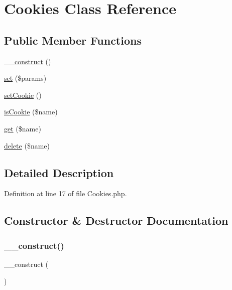 \hypertarget{class_zest_1_1_cookies_1_1_cookies}{}\section{Cookies Class Reference}
\label{class_zest_1_1_cookies_1_1_cookies}
\subsection*{Public Member Functions}
\begin{DoxyCompactItemize}
\item 
\mbox{\hyperlink{class_zest_1_1_cookies_1_1_cookies_a095c5d389db211932136b53f25f39685}{\+\_\+\+\_\+construct}} ()
\item 
\mbox{\hyperlink{class_zest_1_1_cookies_1_1_cookies_a8b2f390bd6d86a3f047038e3535028b8}{set}} (\$params)
\item 
\mbox{\hyperlink{class_zest_1_1_cookies_1_1_cookies_a46c656a0b18e88410d3067af69868a63}{set\+Cookie}} ()
\item 
\mbox{\hyperlink{class_zest_1_1_cookies_1_1_cookies_ac6f668aff0e191a6077c7b2c1694d4cd}{is\+Cookie}} (\$name)
\item 
\mbox{\hyperlink{class_zest_1_1_cookies_1_1_cookies_af5ea6a083ddb07beb8a30dd32e309ceb}{get}} (\$name)
\item 
\mbox{\hyperlink{class_zest_1_1_cookies_1_1_cookies_af7c3ea3150164bc92700134803f277be}{delete}} (\$name)
\end{DoxyCompactItemize}


\subsection{Detailed Description}


Definition at line 17 of file Cookies.\+php.



\subsection{Constructor \& Destructor Documentation}
\mbox{\label{class_zest_1_1_cookies_1_1_cookies_a095c5d389db211932136b53f25f39685}} 
\subsubsection{\texorpdfstring{\+\_\+\+\_\+construct()}{\_\_construct()}}
{\footnotesize\ttfamily \+\_\+\+\_\+construct (\begin{DoxyParamCaption}{ }\end{DoxyParamCaption})}

